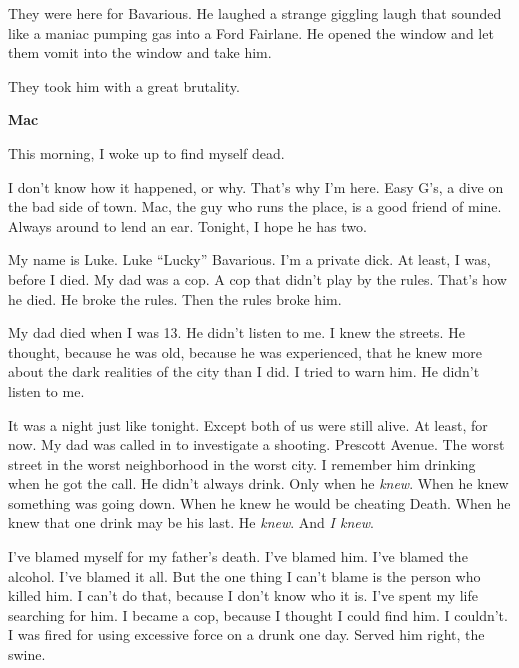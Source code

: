 They were here for Bavarious. He laughed a strange giggling laugh
that sounded like a maniac pumping gas into a Ford Fairlane. He
opened the window and let them vomit into the window and take
him.



They took him with a great brutality. 

 





{\bf Mac}



This morning, I woke up to find myself dead.



I don't know how it happened, or why. That's why I'm here. Easy
G's, a dive on the bad side of town. Mac, the guy who runs the
place, is a good friend of mine. Always around to lend an ear.
Tonight, I hope he has two.



My name is Luke. Luke ``Lucky'' Bavarious. I'm a private dick. At
least, I was, before I died. My dad was a cop. A cop that didn't
play by the rules. That's how he died. He broke the rules. Then the
rules broke him.



My dad died when I was 13. He didn't listen to me. I knew the
streets. He thought, because he was old, because he was
experienced, that he knew more about the dark realities of the city
than I did. I tried to warn him. He didn't listen to me.



It was a night just like tonight. Except both of us were still
alive. At least, for now. My dad was called in to investigate a
shooting. Prescott Avenue. The worst street in the worst
neighborhood in the worst city. I remember him drinking when he got
the call. He didn't always drink. Only when he {\em knew}. When he
knew something was going down. When he knew he would be cheating
Death. When he knew that one drink may be his last. He {\em knew}.
And {\em I knew}.



I've blamed myself for my father's death. I've blamed him. I've
blamed the alcohol. I've blamed it all. But the one thing I can't
blame is the person who killed him. I can't do that, because I
don't know who it is. I've spent my life searching for him. I
became a cop, because I thought I could find him. I couldn't. I was
fired for using excessive force on a drunk one day. Served him
right, the swine.



